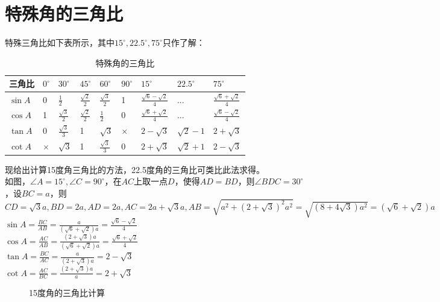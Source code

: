 \section{特殊角的三角比}
\begin{theorem}
    特殊三角比如下表所示，其中$15^\circ,22.5^\circ,75^\circ$只作了解：
\end{theorem}
\begin{table}[H]
    \centering
    \caption{特殊角的三角比}
    \begin{tabular}{l|l|l|l|l|l|l|l|l}
        \hline
        \hline
        三角比      & $0^\circ$ & $30^\circ$         & $45^\circ$          & $60^\circ$         & $90^\circ$ & $15^\circ$                  & $22.5^\circ$ & $75^\circ$                  \\
        \hline
        $\sin A$ & 0         & $\frac{1}{2}$      & $\frac{\sqrt 2}{2}$ & $\frac{\sqrt3}{2}$ & 1          & $\frac{\sqrt 6-\sqrt 2}{4}$ & ...          & $\frac{\sqrt 6+\sqrt 2}{4}$ \\
        \hline
        $\cos A$ & 1         & $\frac{\sqrt3}{2}$ & $\frac{\sqrt 2}{2}$ & $\frac{1}{2}$      & 0          & $\frac{\sqrt 6+\sqrt 2}{4}$ & ...          & $\frac{\sqrt 6-\sqrt 2}{4}$ \\
        \hline
        $\tan A$ & 0         & $\frac{\sqrt3}{3}$ & 1                   & $\sqrt3$           & $\times$   & $2-\sqrt 3 $                & $\sqrt2 - 1$ & $2+\sqrt 3$                 \\
        \hline
        $\cot A$ & $\times$  & $\sqrt3$           & 1                   & $\frac{\sqrt3}{3}$ & 0          & $2+\sqrt 3 $                & $\sqrt2 + 1$ & $2-\sqrt 3$                 \\
        \hline
        \hline
    \end{tabular}
\end{table}
\begin{theorem}
    现给出计算15度角三角比的方法，22.5度角的三角比可类比此法求得。\\
    如图，$\angle A=15^\circ,\angle C=90^\circ$，在$AC$上取一点$D$，使得$AD=BD$，则$\angle BDC=30^\circ$，设$BC=a$，则$CD=\sqrt3 a,BD=2a,AD=2a,AC=2a+\sqrt3 a,AB=\sqrt{a^2+(2+\sqrt3)^2a^2}=\sqrt{(8+4\sqrt3)a^2}=(\sqrt6+\sqrt2)a$ \\
    $\sin A=\frac{BC}{AB}=\frac{a}{(\sqrt6+\sqrt2)a}=\frac{\sqrt6-\sqrt2}{4}$ \\
    $\cos A=\frac{AC}{AB}=\frac{(2+\sqrt3)a}{(\sqrt6+\sqrt2)a}=\frac{\sqrt6+\sqrt2}{4}$ \\
    $\tan A=\frac{BC}{AC}=\frac{a}{(2+\sqrt3)a}=2-\sqrt3 $ \\
    $\cot A=\frac{AC}{BC}=\frac{(2+\sqrt3)a}{a}=2+\sqrt3 $ \\
\end{theorem}
\begin{figure}[H]
    \centering
    \resizebox{4cm}{!}{}
    \caption{15度角的三角比计算}
\end{figure}
\clearpage

